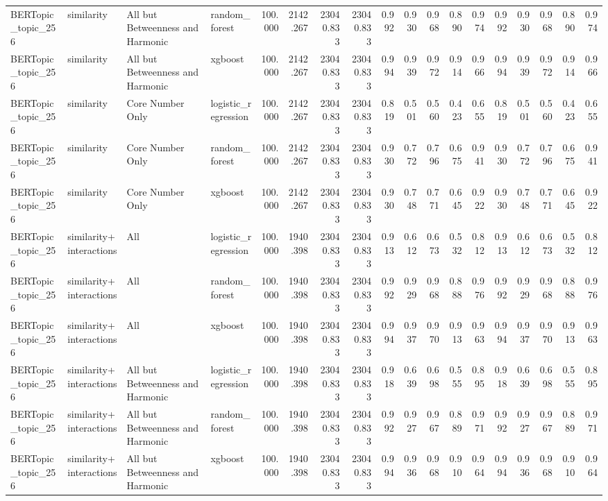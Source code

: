 \begin{tabular}{llllrrrrrrrrrrrrrr}
BERTopic\_topic\_256 & similarity & All but Betweenness and Harmonic & random\_forest & 100.000 & 2142.267 & 23040.833 & 23040.833 & 0.992 & 0.930 & 0.968 & 0.890 & 0.974 & 0.992 & 0.930 & 0.968 & 0.890 & 0.974 \\
BERTopic\_topic\_256 & similarity & All but Betweenness and Harmonic & xgboost & 100.000 & 2142.267 & 23040.833 & 23040.833 & 0.994 & 0.939 & 0.972 & 0.914 & 0.966 & 0.994 & 0.939 & 0.972 & 0.914 & 0.966 \\
BERTopic\_topic\_256 & similarity & Core Number Only & logistic\_regression & 100.000 & 2142.267 & 23040.833 & 23040.833 & 0.819 & 0.501 & 0.560 & 0.423 & 0.655 & 0.819 & 0.501 & 0.560 & 0.423 & 0.655 \\
BERTopic\_topic\_256 & similarity & Core Number Only & random\_forest & 100.000 & 2142.267 & 23040.833 & 23040.833 & 0.930 & 0.772 & 0.796 & 0.675 & 0.941 & 0.930 & 0.772 & 0.796 & 0.675 & 0.941 \\
BERTopic\_topic\_256 & similarity & Core Number Only & xgboost & 100.000 & 2142.267 & 23040.833 & 23040.833 & 0.930 & 0.748 & 0.771 & 0.645 & 0.922 & 0.930 & 0.748 & 0.771 & 0.645 & 0.922 \\
BERTopic\_topic\_256 & similarity+interactions & All & logistic\_regression & 100.000 & 1940.398 & 23040.833 & 23040.833 & 0.913 & 0.612 & 0.673 & 0.532 & 0.812 & 0.913 & 0.612 & 0.673 & 0.532 & 0.812 \\
BERTopic\_topic\_256 & similarity+interactions & All & random\_forest & 100.000 & 1940.398 & 23040.833 & 23040.833 & 0.992 & 0.929 & 0.968 & 0.888 & 0.976 & 0.992 & 0.929 & 0.968 & 0.888 & 0.976 \\
BERTopic\_topic\_256 & similarity+interactions & All & xgboost & 100.000 & 1940.398 & 23040.833 & 23040.833 & 0.994 & 0.937 & 0.970 & 0.913 & 0.963 & 0.994 & 0.937 & 0.970 & 0.913 & 0.963 \\
BERTopic\_topic\_256 & similarity+interactions & All but Betweenness and Harmonic & logistic\_regression & 100.000 & 1940.398 & 23040.833 & 23040.833 & 0.918 & 0.639 & 0.698 & 0.555 & 0.895 & 0.918 & 0.639 & 0.698 & 0.555 & 0.895 \\
BERTopic\_topic\_256 & similarity+interactions & All but Betweenness and Harmonic & random\_forest & 100.000 & 1940.398 & 23040.833 & 23040.833 & 0.992 & 0.927 & 0.967 & 0.889 & 0.971 & 0.992 & 0.927 & 0.967 & 0.889 & 0.971 \\
BERTopic\_topic\_256 & similarity+interactions & All but Betweenness and Harmonic & xgboost & 100.000 & 1940.398 & 23040.833 & 23040.833 & 0.994 & 0.936 & 0.968 & 0.910 & 0.964 & 0.994 & 0.936 & 0.968 & 0.910 & 0.964 \\

\end{tabular}
